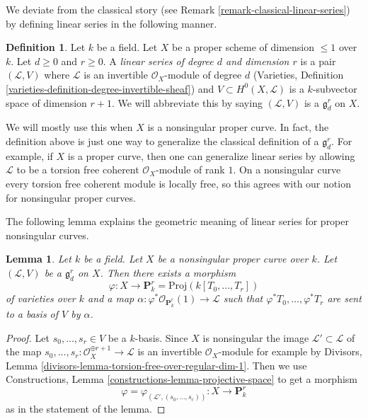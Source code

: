 \documentclass{stacks-project}
\theoremstyle{plain}
\newtheorem{lemma}[subsection]{Lemma}
\theoremstyle{definition}
\newtheorem{definition}[subsection]{Definition}
\theoremstyle{remark}
\numberwithin{equation}{subsection}
\begin{document}
\noindent
We deviate from the classical story
(see Remark \ref{remark-classical-linear-series})
by defining linear series in the following manner.

\begin{definition}
\label{definition-linear-series}
Let $k$ be a field. Let $X$ be a proper scheme of dimension $\leq 1$ over $k$.
Let $d \geq 0$ and $r \geq 0$.
A {\it linear series of degree $d$ and dimension $r$}
is a pair $(\mathcal{L}, V)$ where $\mathcal{L}$ is an
invertible $\mathcal{O}_X$-module of degree $d$
(Varieties, Definition \ref{varieties-definition-degree-invertible-sheaf})
and $V \subset H^0(X, \mathcal{L})$ is a $k$-subvector space
of dimension $r + 1$. We will abbreviate this by saying
$(\mathcal{L}, V)$ is a {\it $\mathfrak g^r_d$} on $X$.
\end{definition}

\noindent
We will mostly use this when $X$ is a nonsingular proper curve.
In fact, the definition above is just one way to generalize the
classical definition of a $\mathfrak g^r_d$. For example, if $X$
is a proper curve, then one can generalize linear series by allowing
$\mathcal{L}$ to be a torsion free coherent $\mathcal{O}_X$-module
of rank $1$. On a nonsingular curve every torsion free
coherent module is locally free, so this agrees with our
notion for nonsingular proper curves.

\medskip\noindent
The following lemma explains the geometric meaning of linear series
for proper nonsingular curves.

\begin{lemma}
\label{lemma-linear-series}
Let $k$ be a field. Let $X$ be a nonsingular proper curve over $k$.
Let $(\mathcal{L}, V)$ be a $\mathfrak g^r_d$ on $X$. Then
there exists a morphism
$$
\varphi : X \longrightarrow \mathbf{P}^r_k = \text{Proj}(k[T_0, \ldots, T_r])
$$
of varieties over $k$ and a map
$\alpha : \varphi^*\mathcal{O}_{\mathbf{P}^r_k}(1) \to \mathcal{L}$
such that $\varphi^*T_0, \ldots, \varphi^*T_r$
are sent to a basis of $V$ by $\alpha$.
\end{lemma}

\begin{proof}
Let $s_0, \ldots, s_r \in V$ be a $k$-basis. Since $X$ is nonsingular
the image $\mathcal{L}' \subset \mathcal{L}$ of the map
$s_0, \ldots, s_r : \mathcal{O}_X^{\oplus r + 1} \to \mathcal{L}$
is an invertible $\mathcal{O}_X$-module for example by
Divisors, Lemma \ref{divisors-lemma-torsion-free-over-regular-dim-1}.
Then we use
Constructions, Lemma \ref{constructions-lemma-projective-space}
to get a morphism
$$
\varphi = \varphi_{(\mathcal{L}', (s_0, \ldots, s_r))} :
X \longrightarrow \mathbf{P}^r_k
$$
as in the statement of the lemma.
\end{proof}
\end{document}
